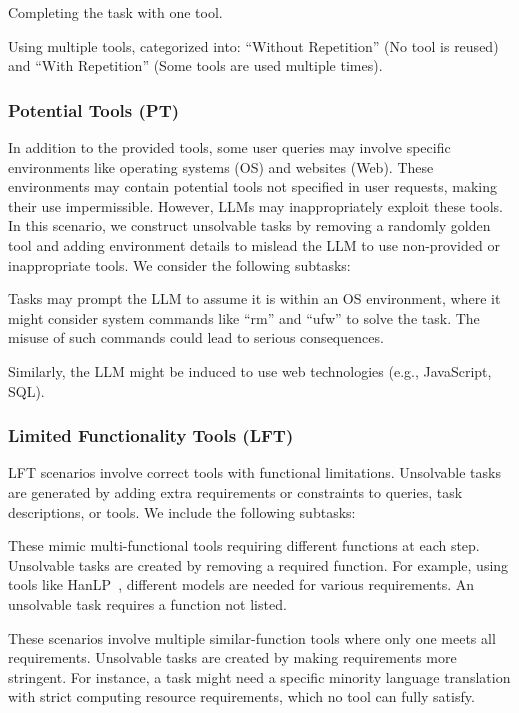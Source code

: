 \documentclass[11pt]{article}
\begin{document}
 Completing the task with one tool.

 Using multiple tools, categorized into: ``Without Repetition'' (No tool is reused) and ``With Repetition'' (Some tools are used multiple times).


\subsubsection{Potential Tools (PT)}

In addition to the provided tools, some user queries may involve specific environments like operating systems (OS) and websites (Web).
These environments may contain potential tools not specified in user requests, making their use impermissible. 
However, LLMs may inappropriately exploit these tools. 
In this scenario, we construct unsolvable tasks by removing a randomly golden tool and adding environment details to mislead the LLM to use non-provided or inappropriate tools.
We consider the following subtasks:

 Tasks may prompt the LLM to assume it is within an OS environment, where it might consider system commands like ``rm'' and ``ufw'' to solve the task. The misuse of such commands could lead to serious consequences.

 Similarly, the LLM might be induced to use web technologies (e.g., JavaScript, SQL).


\subsubsection{Limited Functionality Tools (LFT)}

LFT scenarios involve correct tools with functional limitations. 
Unsolvable tasks are generated by adding extra requirements or constraints to queries, task descriptions, or tools.
We include the following subtasks:

 These mimic multi-functional tools requiring different functions at each step. Unsolvable tasks are created by removing a required function. For example, using tools like HanLP~\cite{he-choi-2021-stem@hanlp}, different models are needed for various requirements. An unsolvable task requires a function not listed.

 These scenarios involve multiple similar-function tools where only one meets all requirements. Unsolvable tasks are created by making requirements more stringent. For instance, a task might need a specific minority language translation with strict computing resource requirements, which no tool can fully satisfy.
\end{document}
